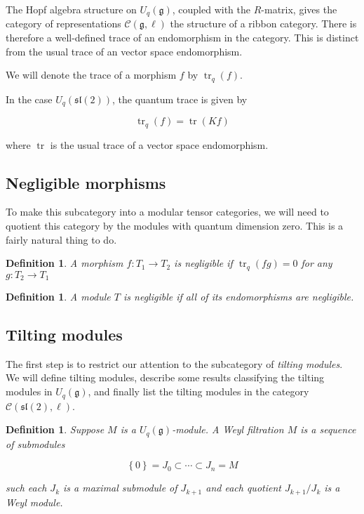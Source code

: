 \documentclass[]{article}
\newtheorem{defn}[theorem]{Definition}
\newcommand{\tr}{\operatorname{tr}}
\newcommand{\sll}{\mathfrak{sl}}
\numberwithin{equation}{subsection}
\begin{document}
The Hopf algebra structure on $U_q(\mathfrak{g})$, coupled with the $R$-matrix,
gives the category of representations $\mathcal{C}(\mathfrak{g}, \ell)$ the
structure of a ribbon category. There is therefore a well-defined trace of an
endomorphism in the category. This is distinct from the usual trace of an
vector space endomorphism. 

We will denote the trace of a morphism $f$ by $\tr_q(f)$.

In the case $U_q(\sll(2))$, the quantum trace is given by 

\begin{equation}
    \tr_q(f) = \tr(Kf)
\end{equation}

where $\tr$ is the usual trace of a vector space endomorphism.

\subsection{Negligible morphisms}
To make this subcategory into a modular tensor categories, we will need to
quotient this category by the modules with quantum dimension zero. This is a
fairly natural thing to do.  %

\begin{defn}
    A morphism $f: T_1 \to T_2$ is \emph{negligible} if $\tr_q(fg) = 0$ for any $g: T_2 \to T_1$
\end{defn}


\begin{defn}
    A module $T$ is \emph{negligible} if all of its endomorphisms are negligible.
\end{defn}
\subsection{Tilting modules} 

The first step is to restrict our attention to the subcategory of \emph{tilting
modules}. We will define tilting modules, describe some results classifying the
tilting modules in $U_q(\mathfrak{g})$, and finally list the tilting modules in
the category $\mathcal{C}(\sll(2), \ell)$.

\begin{defn}
    Suppose $M$ is a $U_q(\mathfrak{g})$-module. A \emph{Weyl filtration} $M$ is a sequence of submodules 

    \begin{equation}
        \left\{ 0 \right\} = J_0 \subset \cdots \subset J_n = M
    \end{equation}

    such each $J_k$ is a maximal submodule of $J_{k+1}$ and each quotient $J_{k+1}/J_k$ is a Weyl module. 
\end{defn}
\end{document}
